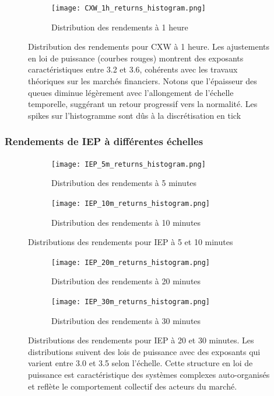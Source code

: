 \documentclass[10pt,a4paper]{article}
\theoremstyle{definition}
\theoremstyle{remark}
\begin{document}
\begin{itemize}
\begin{figure}[H]
    \centering
    \begin{subfigure}[b]{0.45\textwidth}
        \texttt{[image: CXW\_1h\_returns\_histogram.png]}
        \caption{Distribution des rendements à 1 heure}
        \label{fig:CXW_1h_moved}
    \end{subfigure}
    \caption{Distribution des rendements pour CXW à 1 heure. Les ajustements en loi de puissance (courbes rouges) montrent des exposants caractéristiques entre 3.2 et 3.6, cohérents avec les travaux théoriques sur les marchés financiers. Notons que l'épaisseur des queues diminue légèrement avec l'allongement de l'échelle temporelle, suggérant un retour progressif vers la normalité. Les spikes sur l'histogramme sont dûs à la discrétisation en tick}
    \label{fig:CXW_multi_scale_moved}
\end{figure}

\subsubsection{Rendements de IEP à différentes échelles}

\begin{figure}[H]
    \centering
    \begin{subfigure}[b]{0.45\textwidth}
        \texttt{[image: IEP\_5m\_returns\_histogram.png]}
        \caption{Distribution des rendements à 5 minutes}
        \label{fig:IEP_5m_moved}
    \end{subfigure}
    \hfill
    \begin{subfigure}[b]{0.45\textwidth}
        \texttt{[image: IEP\_10m\_returns\_histogram.png]}
        \caption{Distribution des rendements à 10 minutes}
        \label{fig:IEP_10m_moved}
    \end{subfigure}
    \caption{Distributions des rendements pour IEP à 5 et 10 minutes}
\end{figure}

\begin{figure}[H]
    \centering
    \begin{subfigure}[b]{0.45\textwidth}
        \texttt{[image: IEP\_20m\_returns\_histogram.png]}
        \caption{Distribution des rendements à 20 minutes}
        \label{fig:IEP_20m_moved}
    \end{subfigure}
    \hfill
    \begin{subfigure}[b]{0.45\textwidth}
        \texttt{[image: IEP\_30m\_returns\_histogram.png]}
        \caption{Distribution des rendements à 30 minutes}
        \label{fig:IEP_30m_moved}
    \end{subfigure}
    \caption{Distributions des rendements pour IEP à 20 et 30 minutes. Les distributions suivent des lois de puissance avec des exposants qui varient entre 3.0 et 3.5 selon l'échelle. Cette structure en loi de puissance est caractéristique des systèmes complexes auto-organisés et reflète le comportement collectif des acteurs du marché.}
    \label{fig:IEP_multi_scale_moved}
\end{figure}


\end{itemize}
\end{document}
